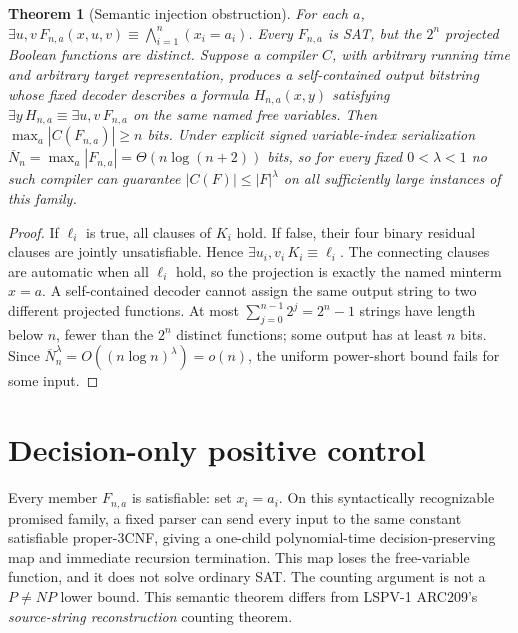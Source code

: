 \documentclass[11pt]{article}
\newtheorem{theorem}{Theorem}
\begin{document}
\begin{theorem}[Semantic injection obstruction]
For each $a$, $\exists u,v\,F_{n,a}(x,u,v)\equiv\bigwedge_{i=1}^n(x_i=a_i)$. Every $F_{n,a}$ is SAT, but the $2^n$ projected Boolean functions are distinct. Suppose a compiler $C$, with arbitrary running time and arbitrary target representation, produces a self-contained output bitstring whose fixed decoder describes a formula $H_{n,a}(x,y)$ satisfying $\exists y\,H_{n,a}\equiv\exists u,v\,F_{n,a}$ on the same named free variables. Then $\max_a|C(F_{n,a})|\ge n$ bits. Under explicit signed variable-index serialization $\overline N_n=\max_a|F_{n,a}|=\Theta(n\log(n+2))$ bits, so for every fixed $0<\lambda<1$ no such compiler can guarantee $|C(F)|\le |F|^\lambda$ on all sufficiently large instances of this family.
\end{theorem}
\begin{proof}
If $\ell_i$ is true, all clauses of $K_i$ hold. If false, their four binary residual clauses are jointly unsatisfiable. Hence $\exists u_i,v_i\,K_i\equiv\ell_i$. The connecting clauses are automatic when all $\ell_i$ hold, so the projection is exactly the named minterm $x=a$. A self-contained decoder cannot assign the same output string to two different projected functions. At most $\sum_{j=0}^{n-1}2^j=2^n-1$ strings have length below $n$, fewer than the $2^n$ distinct functions; some output has at least $n$ bits. Since $\overline N_n^\lambda=O((n\log n)^\lambda)=o(n)$, the uniform power-short bound fails for some input.
\end{proof}

\section{Decision-only positive control}
Every member $F_{n,a}$ is satisfiable: set $x_i=a_i$. On this syntactically recognizable promised family, a fixed parser can send every input to the same constant satisfiable proper-3CNF, giving a one-child polynomial-time decision-preserving map and immediate recursion termination. This map loses the free-variable function, and it does not solve ordinary SAT. The counting argument is not a $P\ne NP$ lower bound. This semantic theorem differs from LSPV-1 ARC209's \emph{source-string reconstruction} counting theorem.
\end{document}

